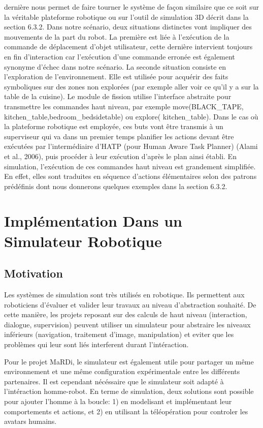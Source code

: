 \documentclass[a4paper,11pt,twoside]{StyleThese}
\begin{document}
dernière nous permet de faire tourner le système de façon similaire que ce soit sur la véritable
plateforme robotique ou sur l’outil de simulation 3D décrit dans la section 6.3.2.
Dans notre scénario, deux situations distinctes vont impliquer des mouvements de la
part du robot. La première est liée à l’exécution de la commande de déplacement d’objet
utilisateur, cette dernière intervient toujours en fin d’interaction car l’exécution d’une
commande erronée est également synonyme d’échec dans notre scénario. La seconde
situation consiste en l’exploration de l’environnement. Elle est utilisée pour acquérir
des faits symboliques sur des zones non explorées (par exemple aller voir ce qu’il y a
sur la table de la cuisine).
Le module de fission utilise l’interface abstraite pour transmettre les commandes
haut niveau, par exemple move(BLACK\_TAPE, kitchen\_table,bedroom\_bedsidetable) ou explore(
kitchen\_table). Dans le cas où la plateforme robotique est employée, ces buts vont
être transmis à un superviseur qui va dans un premier temps planifier les actions devant
être exécutées par l’intermédiaire d’HATP (pour Human Aware Task Planner) (Alami
et al., 2006), puis procéder à leur exécution d’après le plan ainsi établi. En simulation,
l’exécution de ces commandes haut niveau est grandement simplifiée. En effet, elles
sont traduites en séquence d’actions élémentaires selon des patrons prédéfinis dont nous donnerons quelques exemples dans la section 6.3.2.




\section{Implémentation Dans un Simulateur Robotique}

\subsection{Motivation}
Les systèmes de simulation sont très utilisés en robotique. Ils permettent aux roboticiens d'évaluer et valider leur travaux au niveau d'abstraction souhaité. De cette manière, les projets reposant sur des calculs de haut niveau (interaction, dialogue, supervision) peuvent utiliser un simulateur pour abstraire les niveaux inférieurs (navigation, traitement d'image, manipulation) et eviter que les problèmes qui leur sont liés interferent durant l'intéraction.

Pour le projet MaRDi, le simulateur est également utile pour partager un même environnement et une même configuration expérimentale entre les différents partenaires. Il est cependant nécéssaire que le simulateur soit adapté à l'intéraction homme-robot. 
En terme de simulation, deux solutions sont possible pour ajouter l'homme à la boucle: 1) en modelisant et implémentant leur comportements et actions, et 2) en utilisant la téléopération pour controler les avatars humains.
\end{document}
